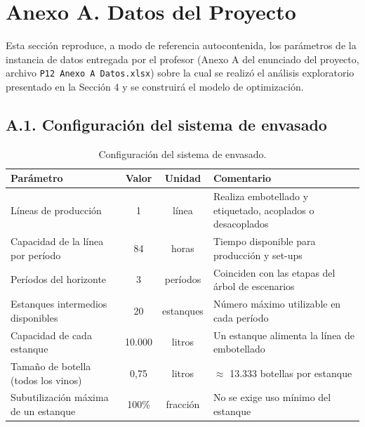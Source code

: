 
\section*{Anexo A. Datos del Proyecto}

Esta sección reproduce, a modo de referencia autocontenida, los parámetros de
la instancia de datos entregada por el profesor (Anexo A del enunciado del
proyecto, archivo \texttt{P12 Anexo A Datos.xlsx}) sobre la cual se realizó el
análisis exploratorio presentado en la Sección 4 y se construirá el modelo de
optimización.

\subsection*{A.1. Configuración del sistema de envasado}

\begin{table}[h]
  \centering
  \begin{tabular}{lccl}
    \toprule
    \textbf{Parámetro} & \textbf{Valor} & \textbf{Unidad} & \textbf{Comentario} \\
    \midrule
    Líneas de producción & 1 & línea & Realiza embotellado y etiquetado, acoplados o desacoplados \\
    Capacidad de la línea por período & 84 & horas & Tiempo disponible para producción y set-ups \\
    Períodos del horizonte & 3 & períodos & Coinciden con las etapas del árbol de escenarios \\
    Estanques intermedios disponibles & 20 & estanques & Número máximo utilizable en cada período \\
    Capacidad de cada estanque & 10.000 & litros & Un estanque alimenta la línea de embotellado \\
    Tamaño de botella (todos los vinos) & 0,75 & litros & $\approx$ 13.333 botellas por estanque \\
    Subutilización máxima de un estanque & 100\% & fracción & No se exige uso mínimo del estanque \\
    \bottomrule
  \end{tabular}
  \caption{Configuración del sistema de envasado.}
  \label{tab:anexoA-configuracion}
\end{table}

